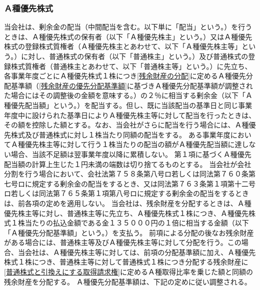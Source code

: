 \documentclass[10pt,a4paper,uplatex]{jsarticle}
\begin{document}
\subsubsection{Ａ種優先株式}
当会社は、剰余金の配当（中間配当を含む。以下単に「配当」という。）を行うときは、Ａ種優先株式の保有者（以下「Ａ種優先株主」という。）又はＡ種優先株式の登録株式質権者（Ａ種優先株主とあわせて、以下「Ａ種優先株主等」という。）に対し、普通株式の保有者（以下「普通株主」という。）及び普通株式の登録株式質権者（普通株主とあわせて、以下「普通株主等」という。）に先立ち、各事業年度ごとにＡ種優先株式１株につき\ref{残余財産の分配}に定めるＡ種優先分配基準額（\ref{残余財産の優先分配基準額}に基づきＡ種優先分配基準額が調整された場合にはその調整後の金額を意味する。）の２％に相当する剰余金（以下「Ａ種優先配当額」という。）を配当する。但し、既に当該配当の基準日と同じ事業年度中に設けられた基準日によりＡ種優先株主等に対して配当を行ったときは、その額を控除した額とする。なお、当会社がさらに配当を行う場合には、Ａ種優先株式及び普通株式に対し１株当たり同額の配当をする。
\label{優先配当}
\term ある事業年度においてＡ種優先株主等に対して行う１株当たりの配当の額がＡ種優先配当額に達しない場合、当該不足額は翌事業年度以降に累積しない。
\term 第１項に基づくＡ種優先配当額の計算上生じた１円未満の端数は切り捨てるものとする。
\term 当会社が会社分割を行う場合において、会社法第７５８条第八号ロ若しくは同法第７６０条第七号ロに規定する剰余金の配当をするとき、又は同法第７６３条第１項第十二号ロ若しくは同法第７６５条第１項第八号ロに規定する剰余金の配当をするときは、前各項の定めを適用しない。
当会社は、残余財産を分配するときは、Ａ種優先株主等に対し、普通株主等に先立ち、Ａ種優先株式１株につき、Ａ種優先株式１株当たりの払込金額である金１３５０００円の１倍に相当する金額（以下「Ａ種優先分配基準額」という。）を支払う。
\label{残余財産の分配}
\term 前項による分配の後なお残余財産がある場合には、普通株主等及びＡ種優先株主等に対して分配を行う。この場合、当会社は、Ａ種優先株主等に対しては、前項の分配基準額に加え、Ａ種優先株式１株につき、普通株主等に対して普通株式１株につき分配する残余財産に\ref{普通株式と引換えにする取得請求権}に定めるＡ種取得比率を乗じた額と同額の残余財産を分配する。
\term Ａ種優先分配基準額は、下記の定めに従い調整される。
\label{残余財産の優先分配基準額}
\end{document}
